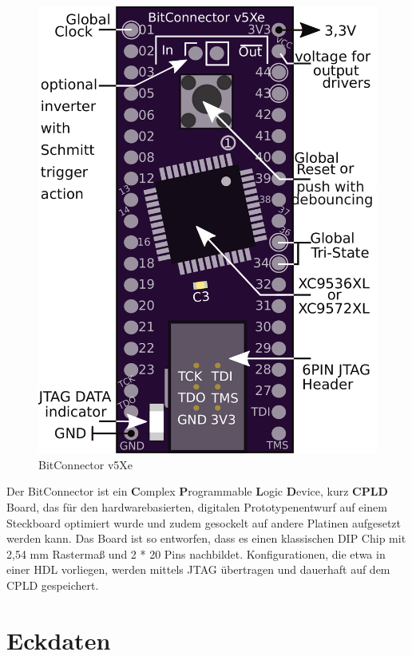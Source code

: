 \documentclass{article}
\begin{document}
\vspace{0.5cm}


\begin{figure}
		\vspace { -15pt }
	\includegraphics[scale=0.3]{BitConnector_Overview} 
	\caption{BitConnector v5Xe}
	\label{fig:}
\end{figure}

Der BitConnector ist ein \textbf{C}omplex \textbf{P}rogrammable \textbf{L}ogic \textbf{D}evice, kurz \textbf{CPLD} Board, das für den  hardwarebasierten, digitalen Prototypenentwurf auf einem Steckboard optimiert wurde und zudem gesockelt auf andere Platinen aufgesetzt werden kann. Das Board ist so entworfen, dass es einen klassischen DIP Chip mit 2,54 mm Rastermaß und 2 * 20 Pins nachbildet. Konfigurationen, die etwa in einer HDL vorliegen, werden mittels JTAG übertragen und dauerhaft auf dem CPLD gespeichert.
 

\section{Eckdaten} 
\end{document}
